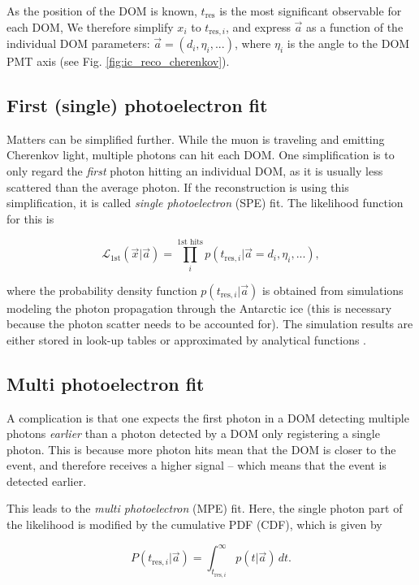 \documentclass[
    a4paper, %
    fontsize=10pt, %
    twoside=false, %
    numbers=noenddot, %
    fontmethod=tex,
]{kaobook}
\begin{document}
As the position of the DOM is known, $t_\text{res}$ is the most significant observable for each DOM,  We therefore simplify $x_i$ to $t_{\text{res},i}$, and express $\vec{a}$ as a function of the individual DOM parameters: $\vec{a}= (d_i,\eta_i,...)$, where $\eta_i$ is the angle to the DOM PMT axis (see Fig. \ref{fig:ic_reco_cherenkov}).


\subsection{First (single) photoelectron fit}
Matters can be simplified further. While the muon is traveling and emitting Cherenkov light, multiple photons can hit each DOM. One simplification is to only regard the \textit{first} photon hitting an individual DOM, as it is usually less scattered than the average photon. If the reconstruction is using this simplification, it is called \textit{single photoelectron} (SPE) fit. The likelihood function for this is

\begin{equation}
\mathcal{L}_\text{1st}(\vec{x}|\vec{a}) = \prod_i^\text{1st hits} p(t_{\text{res},i}|\vec{a}=d_i, \eta_i,...),
\end{equation}

where the probability density function $p(t_{\text{res},i}|\vec{a})$ is obtained from simulations modeling the photon propagation through the Antarctic ice (this is necessary because the photon scatter needs to be accounted for). The simulation results are either stored in look-up tables or approximated by analytical functions \cite{Ahrens2004}. 

\subsection{Multi photoelectron fit}
A complication is that one expects the first photon in a DOM detecting multiple photons \textit{earlier} than a photon detected by a DOM only registering a single photon. This is because more photon hits mean that the DOM is closer to the event, and therefore receives a higher signal -- which means that the event is detected earlier. 

This leads to the \textit{multi photoelectron} (MPE) fit. Here, the single photon part of the likelihood is modified by the cumulative PDF (CDF), which is given by

\begin{equation}
P(t_{\text{res},i}|\vec{a}) = \int^{\infty}_{t_{\text{res},i}}p(t|\vec{a})\,dt.
\end{equation}
\end{document}
